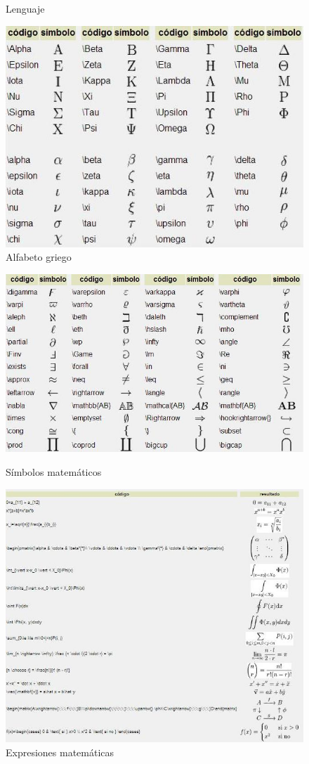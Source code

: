 \documentclass[10pt,oneside]{report}
\begin{document}
{\begin{figure}[h]
	\caption{Lenguaje}
	\includegraphics[width=.60\textwidth]{./imagenes/lenguaje2.jpg}
	\caption{Alfabeto griego}
\end{figure}
\begin{figure}[t]
	\centering
	\includegraphics[width=.80\textwidth]{./imagenes/lenguaje3.jpg}
	\caption{Símbolos matemáticos}
	\includegraphics[width=.80\textwidth]{./imagenes/lenguaje4.jpg}
	\caption{Expresiones matemáticas}
\end{figure}
}
\end{document}
